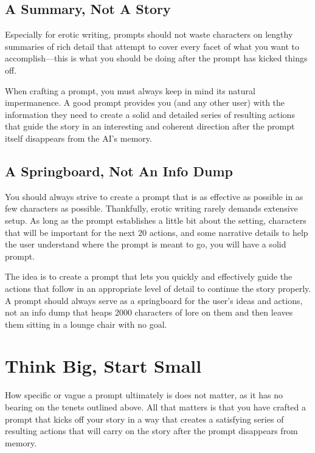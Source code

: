 ﻿\documentclass[Coomer-main.tex]{subfiles}
\begin{document}
\subsection{A Summary, Not A Story}

Especially for erotic writing, prompts should not waste characters on lengthy summaries of rich detail that attempt to cover every facet of what you want to accomplish—this is what you should be doing after the prompt has kicked things off.

When crafting a prompt, you must always keep in mind its natural impermanence.
A good prompt provides you (and any other user) with the information they need to create a solid and detailed series of resulting actions that guide the story in an interesting and coherent direction after the prompt itself disappears from the AI's memory.

\subsection{A Springboard, Not An Info Dump}

You should always strive to create a prompt that is as effective as possible in as few characters as possible.
Thankfully, erotic writing rarely demands extensive setup.
As long as the prompt establishes a little bit about the setting, characters that will be important for the next 20 actions, and some narrative details to help the user understand where the prompt is meant to go, you will have a solid prompt.

The idea is to create a prompt that lets you quickly and effectively guide the actions that follow in an appropriate level of detail to continue the story properly.
A prompt should always serve as a springboard for the user's ideas and actions, not an info dump that heaps 2000 characters of lore on them and then leaves them sitting in a lounge chair with no goal.

\section{Think Big, Start Small}

How specific or vague a prompt ultimately is does not matter, as it has no bearing on the tenets outlined above.
All that matters is that you have crafted a prompt that kicks off your story in a way that creates a satisfying series of resulting actions that will carry on the story after the prompt disappears from memory.
\end{document}
